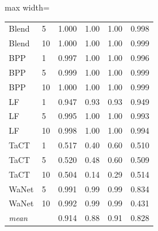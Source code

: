 \begin{table}[htbp]
\begin{adjustbox}{max width=\linewidth}
\begin{tabular}{llrrrr}
Blend & 5 & 1.000 & 1.00 & 1.00 & 0.998 \\
Blend & 10 & 1.000 & 1.00 & 1.00 & 0.999 \\
BPP & 1 & 0.997 & 1.00 & 1.00 & 0.996 \\
BPP & 5 & 0.999 & 1.00 & 1.00 & 0.999 \\
BPP & 10 & 1.000 & 1.00 & 1.00 & 0.999 \\
LF & 1 & 0.947 & 0.93 & 0.93 & 0.949 \\
LF & 5 & 0.995 & 1.00 & 1.00 & 0.993 \\
LF & 10 & 0.998 & 1.00 & 1.00 & 0.994 \\
TaCT & 1 & 0.517 & 0.40 & 0.60 & 0.510 \\
TaCT & 5 & 0.520 & 0.48 & 0.60 & 0.509 \\
TaCT & 10 & 0.504 & 0.14 & 0.29 & 0.514 \\
WaNet & 5 & 0.991 & 0.99 & 0.99 & 0.834 \\
WaNet & 10 & 0.992 & 0.99 & 0.99 & 0.431 \\
\rowcolor{black!8}\emph{mean} &  & 0.914 & 0.88 & 0.91 & 0.828 \\
\bottomrule
\end{tabular}
\end{adjustbox}
\end{table}

